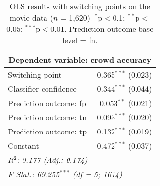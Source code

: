 \documentclass[11pt,a4paper]{article}
\begin{document}


\begin{table}
\small
\begin{tabular}{lr}
\toprule
\multicolumn{2}{c}{\textbf{Dependent variable: crowd accuracy}}\\
\midrule
Switching point & -0.365$^{***}$ (0.023) \\ 
Classifier confidence & 0.344$^{***}$ (0.044) \\ 
Prediction outcome: fp & 0.053$^{**}$ \hspace{0.03in} (0.021) \\ 
Prediction outcome: tn & 0.093$^{***}$ (0.020) \\ 
Prediction outcome: tp& 0.132$^{***}$ (0.019) \\ 
 Constant & 0.472$^{***}$ (0.037) \\ 
\midrule 
\multicolumn{2}{l}{\textit{R$^{2}$:  0.177 (Adj.: 0.174)}}\\
\multicolumn{2}{l}{\textit{F Stat.: 69.255$^{***}$ (df = 5; 1614)}}\\
\bottomrule\end{tabular} 
  \caption{OLS results with  switching points on the movie data ($n$ = 1,620). $^{*}$p$<$0.1; $^{**}$p$<$0.05; $^{***}$p$<$0.01. Prediction outcome base level = fn.} 

\label{ols_acc}
\end{table} 
\end{document}
